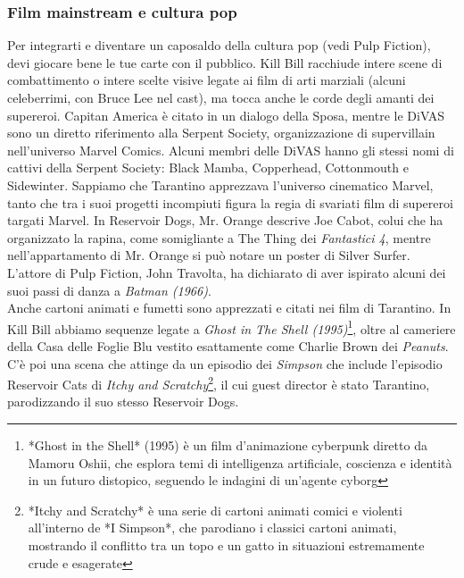 \documentclass[12pt]{article} %
\begin{document}
\subsubsection*{Film mainstream e cultura pop}
\begin{flushleft}
    Per integrarti e diventare un caposaldo della cultura pop (vedi Pulp Fiction), devi giocare bene le tue carte con il pubblico.
    Kill Bill racchiude intere scene di combattimento o intere scelte visive legate ai film di arti marziali (alcuni celeberrimi, con Bruce Lee nel cast), ma tocca anche le corde degli amanti dei supereroi.
    Capitan America è citato in un dialogo della Sposa, mentre le DiVAS sono un diretto riferimento alla Serpent Society, organizzazione di supervillain nell'universo Marvel Comics. 
    Alcuni membri delle DiVAS hanno gli stessi nomi di cattivi della Serpent Society: Black Mamba, Copperhead, Cottonmouth e Sidewinter.
    Sappiamo che Tarantino apprezzava l'universo cinematico Marvel, tanto che tra i suoi progetti incompiuti figura la regia di svariati film di supereroi targati Marvel.
    In Reservoir Dogs, Mr. Orange descrive Joe Cabot, colui che ha organizzato la rapina, come somigliante a The Thing dei \textit{Fantastici 4}, mentre nell'appartamento di Mr. Orange si può notare un poster di Silver Surfer.
    L'attore di Pulp Fiction, John Travolta, ha dichiarato di aver ispirato alcuni dei suoi passi di danza a \textit{Batman (1966)}.\\\vspace{1cm}
    Anche cartoni animati e fumetti sono apprezzati e citati nei film di Tarantino. In Kill Bill abbiamo sequenze legate a \textit{Ghost in The Shell (1995)}\footnote{*Ghost in the Shell* (1995) è un film d'animazione cyberpunk diretto da Mamoru Oshii, che esplora temi di intelligenza artificiale, coscienza e identità in un futuro distopico, seguendo le indagini di un'agente cyborg}, oltre al cameriere della Casa delle Foglie Blu vestito esattamente come Charlie Brown dei \textit{Peanuts}.
    C'è poi una scena che attinge da un episodio dei \textit{Simpson} che include l'episodio Reservoir Cats di \textit{Itchy and Scratchy}\footnote{*Itchy and Scratchy* è una serie di cartoni animati comici e violenti all'interno de *I Simpson*, che parodiano i classici cartoni animati, mostrando il conflitto tra un topo e un gatto in situazioni estremamente crude e esagerate}, il cui guest director è stato Tarantino, parodizzando il suo stesso Reservoir Dogs. \\\vspace{1cm}

\end{flushleft}
\end{document}
